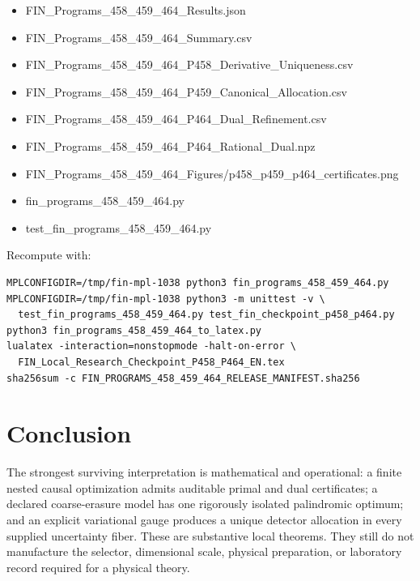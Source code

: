 \documentclass[11pt,a4paper,openany]{report}
\begin{document}
\begin{itemize}
\item 
FIN\_Programs\_458\_459\_464\_Results.json

\item 
FIN\_Programs\_458\_459\_464\_Summary.csv

\item 
FIN\_Programs\_458\_459\_464\_P458\_Derivative\_Uniqueness.csv

\item 
FIN\_Programs\_458\_459\_464\_P459\_Canonical\_Allocation.csv

\item 
FIN\_Programs\_458\_459\_464\_P464\_Dual\_Refinement.csv

\item 
FIN\_Programs\_458\_459\_464\_P464\_Rational\_Dual.npz

\item 
FIN\_Programs\_458\_459\_464\_Figures/\allowbreak{}p458\_p459\_p464\_certificates.png

\item 
fin\_programs\_458\_459\_464.py

\item 
test\_fin\_programs\_458\_459\_464.py

\end{itemize}

Recompute with:

\begin{Verbatim}[fontsize=\small]
MPLCONFIGDIR=/tmp/fin-mpl-1038 python3 fin_programs_458_459_464.py
MPLCONFIGDIR=/tmp/fin-mpl-1038 python3 -m unittest -v \
  test_fin_programs_458_459_464.py test_fin_checkpoint_p458_p464.py
python3 fin_programs_458_459_464_to_latex.py
lualatex -interaction=nonstopmode -halt-on-error \
  FIN_Local_Research_Checkpoint_P458_P464_EN.tex
sha256sum -c FIN_PROGRAMS_458_459_464_RELEASE_MANIFEST.sha256
\end{Verbatim}

\chapter{Conclusion}

The strongest surviving interpretation is mathematical and operational: a finite nested causal optimization admits auditable primal and dual certificates; a declared coarse-erasure model has one rigorously isolated palindromic optimum; and an explicit variational gauge produces a unique detector allocation in every supplied uncertainty fiber. These are substantive local theorems. They still do not manufacture the selector, dimensional scale, physical preparation, or laboratory record required for a physical theory.
\end{document}
